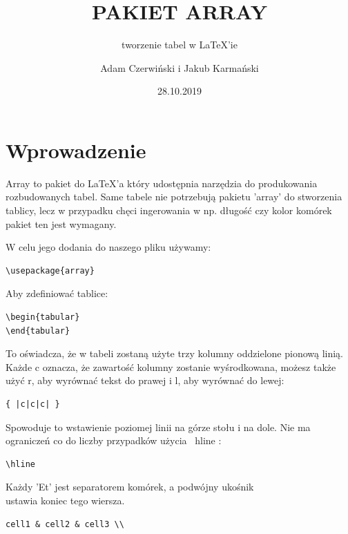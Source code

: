 \documentclass[table]{beamer}
\title{PAKIET ARRAY}
\subtitle{tworzenie tabel w LaTeX'ie}
\author{Adam Czerwiński i Jakub Karmański}
\institute{POLSL}
\date{28.10.2019}
\begin{document}
 
\maketitle
 
\tableofcontents

\section{Wprowadzenie}
\begin{frame}[fragile]
Array to pakiet do LaTeX’a który udostępnia narzędzia do produkowania rozbudowanych tabel. 
Same tabele nie potrzebują pakietu 'array' do stworzenia tablicy, lecz w przypadku chęci ingerowania w np. długość czy kolor komórek pakiet ten jest wymagany.

W celu jego dodania do naszego pliku używamy:

\begin{lstlisting}
\usepackage{array}
\end{lstlisting}
\end{frame}

\begin{frame}[fragile]

Aby zdefiniować tablice:
\begin{lstlisting}
\begin{tabular}
\end{tabular} 
\end{lstlisting}
To oświadcza, że w tabeli zostaną użyte trzy kolumny oddzielone pionową linią. Każde c oznacza, że zawartość kolumny zostanie wyśrodkowana, możesz także użyć r, aby wyrównać tekst do prawej i l, aby wyrównać do lewej:
\begin{lstlisting}
{ |c|c|c| }
\end{lstlisting}
Spowoduje to wstawienie poziomej linii na górze stołu i na dole. Nie ma ograniczeń co do liczby przypadków użycia \ hline :
\begin{lstlisting}
\hline
\end{lstlisting}
Każdy 'Et' jest separatorem komórek, a podwójny ukośnik \\ ustawia koniec tego wiersza.
\begin{lstlisting}
cell1 & cell2 & cell3 \\
\end{lstlisting}
\end{frame}
\end{document}
